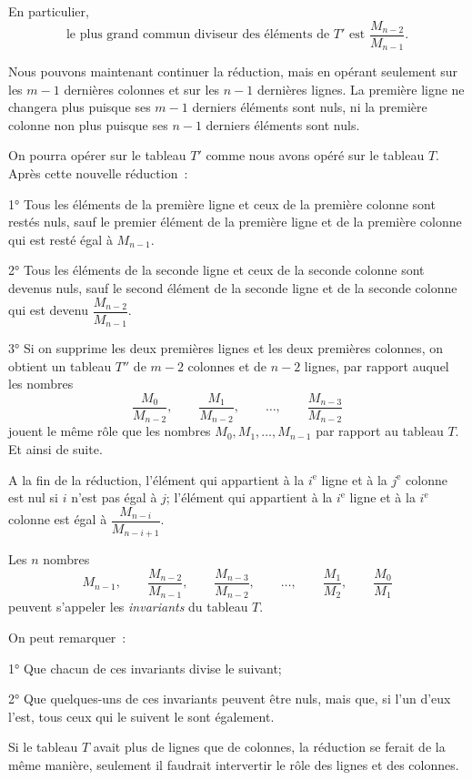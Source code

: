 \documentclass{article}
\begin{document}
En particulier,
\[ \text{le plus grand commun diviseur des éléments de } T' \text{ est } \frac{M_{n-2}}{M_{n-1}}. \]

Nous pouvons maintenant continuer la réduction, mais en opérant seulement sur les $m-1$ dernières colonnes et sur les $n-1$ dernières lignes. La première ligne ne changera plus puisque ses $m-1$ derniers éléments sont nuls, ni la première colonne non plus puisque ses $n-1$ derniers éléments sont nuls.

On pourra opérer sur le tableau $T'$ comme nous avons opéré sur le tableau $T$. Après cette nouvelle réduction~:

1° Tous les éléments de la première ligne et ceux de la première colonne sont restés nuls, sauf le premier élément de la première ligne et de la première colonne qui est resté égal à $M_{n-1}$.

2° Tous les éléments de la seconde ligne et ceux de la seconde colonne sont devenus nuls, sauf le second élément de la seconde ligne et de la seconde colonne qui est devenu $\dfrac{M_{n-2}}{M_{n-1}}$.

3° Si on supprime les deux premières lignes et les deux premières colonnes, on obtient un tableau $T''$ de $m-2$ colonnes et de $n-2$ lignes, par rapport auquel les nombres
\[ \frac{M_{0}}{M_{n-2}}, \qquad \frac{M_{1}}{M_{n-2}}, \qquad \ldots, \qquad \frac{M_{n-3}}{M_{n-2}} \]
jouent le même rôle que les nombres $M_{0}, M_{1}, \ldots, M_{n-1}$ par rapport au tableau $T$. Et ainsi de suite.

A la fin de la réduction, l'élément qui appartient à la $i^{\text{e}}$ ligne et à la $j^{\text{e}}$ colonne est nul si $i$ n'est pas égal à $j$; l'élément qui appartient à la $i^{\text{e}}$ ligne et à la $i^{\text{e}}$ colonne est égal à $\dfrac{M_{n-i}}{M_{n-i+1}}$.

Les $n$ nombres
\[ M_{n-1}, \qquad \frac{M_{n-2}}{M_{n-1}}, \qquad \frac{M_{n-3}}{M_{n-2}}, \qquad \ldots, \qquad \frac{M_{1}}{M_{2}}, \qquad \frac{M_{0}}{M_{1}} \tag{3} \]
peuvent s'appeler les \emph{invariants} du tableau $T$.

On peut remarquer~:

1° Que chacun de ces invariants divise le suivant;

2° Que quelques-uns de ces invariants peuvent être nuls, mais que, si l'un d'eux l'est, tous ceux qui le suivent le sont également.

Si le tableau $T$ avait plus de lignes que de colonnes, la réduction se ferait de la même manière, seulement il faudrait intervertir le rôle des lignes et des colonnes.
\end{document}
